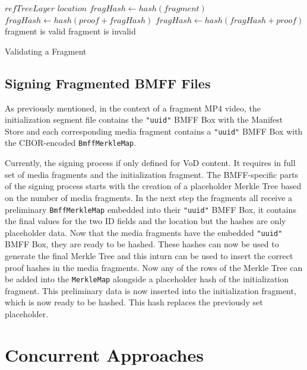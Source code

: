 \begin{algorithm}[H]
    \begin{algorithmic}[1]
        \Require $refTreeLayer$ 
        \Require $location$ 
        \State $fragHash \gets hash(fragment)$
                \State $fragHash \gets hash(proof + fragHash)$
            \Else
                \State $fragHash \gets hash(fragHash + proof)$
            \EndIf
        \EndFor
            \State fragment is valid
        \Else
            \State fragment is invalid
        \EndIf
    \end{algorithmic}
    \caption{Validating a Fragment}
    \label{alg:validate}
\end{algorithm}

\subsection{Signing Fragmented BMFF Files\label{sec:sign_bmff}}

As previously mentioned, in the context of a fragment MP4 video, the initialization segment file contains the \texttt{"uuid"} BMFF Box with the Manifest Store and each corresponding media fragment contains a \texttt{"uuid"} BMFF Box with the CBOR-encoded \texttt{BmffMerkleMap}.

Currently, the signing process if only defined for VoD content. It requires in full set of media fragments and the initialization fragment. The BMFF-specific parts of the signing process starts with the creation of a placeholder Merkle Tree based on the number of media fragments. In the next step the fragments all receive a preliminary \texttt{BmffMerkleMap} embedded into their \texttt{"uuid"} BMFF Box, it contains the final values for the two ID fields and the location but the hashes are only placeholder data. Now that the media fragments have the embedded \texttt{"uuid"} BMFF Box, they are ready to be hashed. These hashes can now be used to generate the final Merkle Tree and this inturn can be used to insert the correct proof hashes in the media fragments. Now any of the rows of the Merkle Tree can be added into the \texttt{MerkleMap} alongside a placeholder hash of the initialization fragment. This preliminary data is now inserted into the initialization fragment, which is now ready to be hashed. This hash replaces the previously set placeholder.

\section{Concurrent Approaches}

